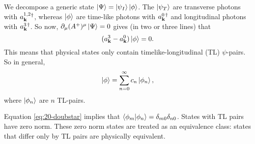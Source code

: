 We decompose a generic state $\ket{\Psi} = \ket{\psi_I} \ket{\phi}$. The $\ket{\psi_T}$ are transverse photons with $a_{\vb{k}}^{1, 2}{}^{\dagger}$, whereas $\ket{\phi}$ are time-like photons with $a_{\vb{k}}^0{}^{\dagger}$ and longitudinal photons with $a_{\vb{k}}^{3}{}^{\dagger}$.
So now, $\partial_{\mu} (A^+)^{\mu} \ket{\Psi} =0$ gives (in two or three lines) that
\begin{equation}
  \label{eq:20-doubstar}
  (a_{\vb{k}}^3 - a^0_{\vb{k}})\ket{\phi} = 0.
\end{equation}
This means that physical states only contain timelike-longitudinal (TL) $\psi$-pairs.
So in general, 
\begin{equation}
  \ket{\phi} = \sum_{n = 0}^{\infty} c_n \ket{\phi_n},
\end{equation}
where $\ket{\phi_n}$ are $n$ TL-pairs.

Equation \eqref{eq:20-doubstar} implies that $\bra{\phi_m}\ket{\phi_n} = \delta_{m0} \delta_{n0}$. 
States with TL pairs have zero norm. These zero norm states are treated as an equivalence class: states that differ only by TL pairs are physically equivalent.
